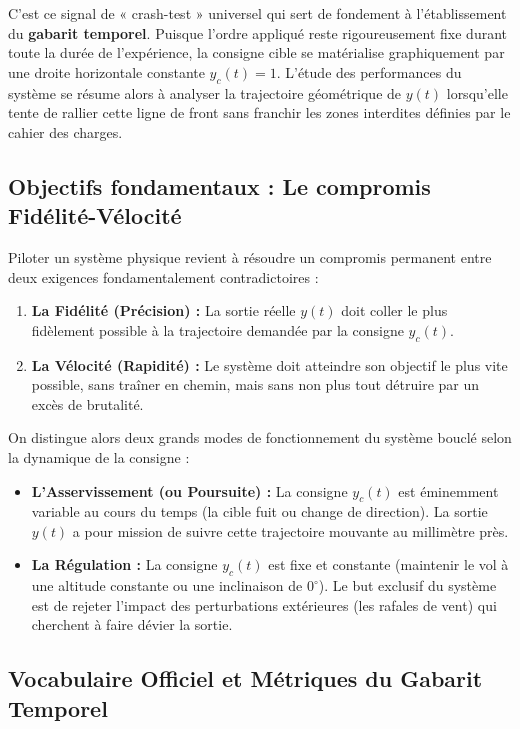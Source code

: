 \documentclass[11pt,a4paper]{report}
\begin{document}
C'est ce signal de « crash-test » universel qui sert de fondement à l'établissement du \textbf{gabarit temporel}. Puisque l'ordre appliqué reste rigoureusement fixe durant toute la durée de l'expérience, la consigne cible se matérialise graphiquement par une droite horizontale constante $y_c(t) = 1$. L'étude des performances du système se résume alors à analyser la trajectoire géométrique de $y(t)$ lorsqu'elle tente de rallier cette ligne de front sans franchir les zones interdites définies par le cahier des charges.

\subsection{Objectifs fondamentaux : Le compromis Fidélité-Vélocité}

Piloter un système physique revient à résoudre un compromis permanent entre deux exigences fondamentalement contradictoires :
\begin{enumerate}
    \item \textbf{La Fidélité (Précision) :} La sortie réelle $y(t)$ doit coller le plus fidèlement possible à la trajectoire demandée par la consigne $y_c(t)$.
    \item \textbf{La Vélocité (Rapidité) :} Le système doit atteindre son objectif le plus vite possible, sans traîner en chemin, mais sans non plus tout détruire par un excès de brutalité.
\end{enumerate}

On distingue alors deux grands modes de fonctionnement du système bouclé selon la dynamique de la consigne :
\begin{itemize}
    \item \textbf{L'Asservissement (ou Poursuite) :} La consigne $y_c(t)$ est éminemment variable au cours du temps (la cible fuit ou change de direction). La sortie $y(t)$ a pour mission de suivre cette trajectoire mouvante au millimètre près.
    \item \textbf{La Régulation :} La consigne $y_c(t)$ est fixe et constante (maintenir le vol à une altitude constante ou une inclinaison de $0^{\circ}$). Le but exclusif du système est de rejeter l'impact des perturbations extérieures (les rafales de vent) qui cherchent à faire dévier la sortie.
\end{itemize}

\subsection{Vocabulaire Officiel et Métriques du Gabarit Temporel}
\end{document}
